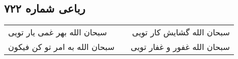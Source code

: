 \begin{center}
\section*{رباعی شماره ۷۲۲}
\label{sec:sh722}
\begin{longtable}{l p{0.5cm} r}
سبحان الله بهر غمی یار تویی
&&
سبحان الله گشایش کار تویی
\\
سبحان الله به امر تو کن فیکون
&&
سبحان الله غفور و غفار تویی
\\
\end{longtable}
\end{center}
